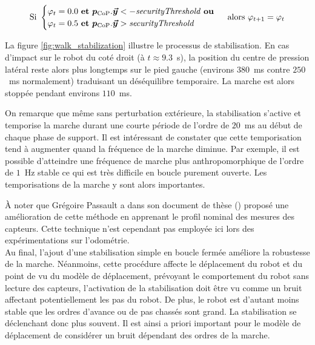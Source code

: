 $$
\text{Si }
\begin{cases}
    \varphi_{t} = 0.0 \text{ \textbf{et} } \bm{p}_{\text{CoP}}.\bm{\vec{y}} < -\text{\textit{securityThreshold} \textbf{ou}}\\
    \varphi_{t} = 0.5 \text{ \textbf{et} } \bm{p}_{\text{CoP}}.\bm{\vec{y}} > \text{\textit{securityThreshold}}\\
\end{cases}
\text{ alors }
\varphi_{t+1} = \varphi_{t}
$$

La figure \ref{fig:walk_stabilization} illustre le processus de stabilisation.
En cas d'impact sur le robot du coté droit (à $t \approx 9.3$~s), 
la position du centre de pression latéral reste alors plus longtemps sur
le pied gauche (environs $380$~ms contre $250$~ms normalement) traduisant
un déséquilibre temporaire. 
La marche est alors stoppée pendant environs $110$~ms.

On remarque que même sans perturbation extérieure, la stabilisation s'active et
temporise la marche durant une courte période de l'ordre de $20$~ms 
au début de chaque phase de support. Il est intéressant de constater que cette
temporisation tend à augmenter quand la fréquence de la marche diminue. 
Par exemple, il est possible d'atteindre une fréquence de marche plus anthropomorphique 
de l'ordre de $1$~Hz stable ce qui est très difficile en boucle purement ouverte. 
Les temporisations de la marche y sont alors importantes.

À noter que Grégoire Passault a dans son document de thèse 
(\cite{PassaultThesis}) proposé une amélioration de cette 
méthode en apprenant le profil nominal des mesures des capteurs.
Cette technique n'est cependant pas employée ici lors des expérimentations 
sur l'odométrie.\\

Au final, l'ajout d'une stabilisation simple en boucle fermée améliore
la robustesse de la marche.
Néanmoins, cette procédure affecte le déplacement du robot et du point de vu
du modèle de déplacement, prévoyant le comportement du robot sans lecture
des capteurs, l'activation de la stabilisation doit être vu comme un bruit
affectant potentiellement les pas du robot.
De plus, le robot est d'autant moins stable que les ordres d'avance ou de pas
chassés sont grand. La stabilisation se déclenchant donc plus souvent.
Il est ainsi a priori important pour le modèle de déplacement 
de considérer un bruit dépendant des ordres de la marche.

